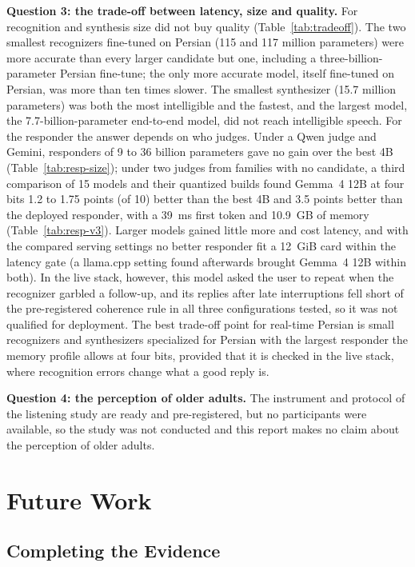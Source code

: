 \textbf{Question 3: the trade-off between latency, size and quality.} For recognition and synthesis size
did not buy quality (Table~\ref{tab:tradeoff}). The two smallest recognizers fine-tuned on Persian (115 and 117
million parameters) were more accurate than every larger candidate but one, including a
three-billion-parameter Persian fine-tune; the only more accurate model, itself fine-tuned on Persian,
was more than ten times slower. The smallest synthesizer (15.7 million parameters) was both the most
intelligible and the fastest, and the largest model, the 7.7-billion-parameter end-to-end model, did
not reach intelligible speech. For the responder the answer depends on who judges. Under a Qwen judge
and Gemini, responders of 9 to 36 billion parameters gave no gain over the best 4B
(Table~\ref{tab:resp-size}); under two judges from families with no candidate, a third comparison of
15 models and their quantized builds found Gemma~4 12B at four bits 1.2 to 1.75 points (of 10) better
than the best 4B and 3.5 points better than the deployed responder, with a 39~ms first token and
10.9~GB of memory (Table~\ref{tab:resp-v3}). Larger models gained little more and cost latency, and
with the compared serving settings no better responder fit a 12~GiB card within the latency gate
(a llama.cpp setting found afterwards brought Gemma~4 12B within both). In the live stack, however,
this model asked the user to repeat when the recognizer garbled a follow-up, and its replies after late
interruptions fell short of the pre-registered coherence rule in all three configurations tested,
so it was not qualified for deployment.
The best trade-off point for real-time Persian is small recognizers and synthesizers specialized for
Persian with the largest responder the memory profile allows at four bits, provided that it is
checked in the live stack, where recognition errors change what a good reply is.

\textbf{Question 4: the perception of older adults.} The instrument and protocol of the listening study
are ready and pre-registered, but no participants were available, so the study was not conducted and
this report makes no claim about the perception of older adults.

\section{Future Work}
\label{sec:future}

\subsection{Completing the Evidence}

